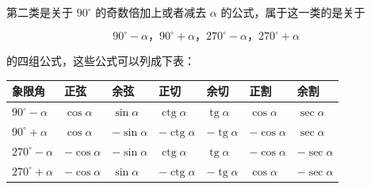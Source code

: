 第二类是关于 \(90^{\circ}\) 的奇数倍加上或者减去 \(\alpha\)
的公式，属于这一类的是关于

\[
90 ^{\circ} - \alpha \text{，} 90 ^{\circ} + \alpha \text{，} 270 ^{\circ} - \alpha \text{，} 270 ^{\circ} + \alpha
\]

的四组公式，这些公式可以列成下表：

{\def\LTcaptype{none} %
\begin{longtable}[]{@{}
  >{\raggedright\arraybackslash}p{}
  >{\raggedright\arraybackslash}p{}
  >{\raggedright\arraybackslash}p{}
  >{\raggedright\arraybackslash}p{}
  >{\raggedright\arraybackslash}p{}
  >{\raggedright\arraybackslash}p{}
  >{\raggedright\arraybackslash}p{}@{}}
\toprule\noalign{}
\begin{minipage}[b]{\linewidth}\raggedright
象限角
\end{minipage} & \begin{minipage}[b]{\linewidth}\raggedright
正弦
\end{minipage} & \begin{minipage}[b]{\linewidth}\raggedright
余弦
\end{minipage} & \begin{minipage}[b]{\linewidth}\raggedright
正切
\end{minipage} & \begin{minipage}[b]{\linewidth}\raggedright
余切
\end{minipage} & \begin{minipage}[b]{\linewidth}\raggedright
正割
\end{minipage} & \begin{minipage}[b]{\linewidth}\raggedright
余割
\end{minipage} \\
\midrule\noalign{}
\endhead
\bottomrule\noalign{}
\endlastfoot
\(90^{\circ}-\alpha\) & \(\cos\alpha\) & \(\sin\alpha\) &
\(\operatorname{ctg}\alpha\) & \(\operatorname{tg}\alpha\) &
\(\cos\alpha\) & \(\sec\alpha\) \\
\(90^{\circ}+\alpha\) & \(\cos\alpha\) & \(-\sin\alpha\) &
\(-\operatorname{ctg}\alpha\) & \(-\operatorname{tg}\alpha\) &
\(-\cos\alpha\) & \(\sec\alpha\) \\
\(270^{\circ}-\alpha\) & \(-\cos\alpha\) & \(-\sin\alpha\) &
\(\operatorname{ctg}\alpha\) & \(\operatorname{tg}\alpha\) &
\(-\cos\alpha\) & \(-\sec\alpha\) \\
\(270^{\circ}+\alpha\) & \(-\cos\alpha\) & \(\sin\alpha\) &
\(-\operatorname{ctg}\alpha\) & \(-\operatorname{tg}\alpha\) &
\(\cos\alpha\) & \(-\sec\alpha\) \\
\end{longtable}
}

